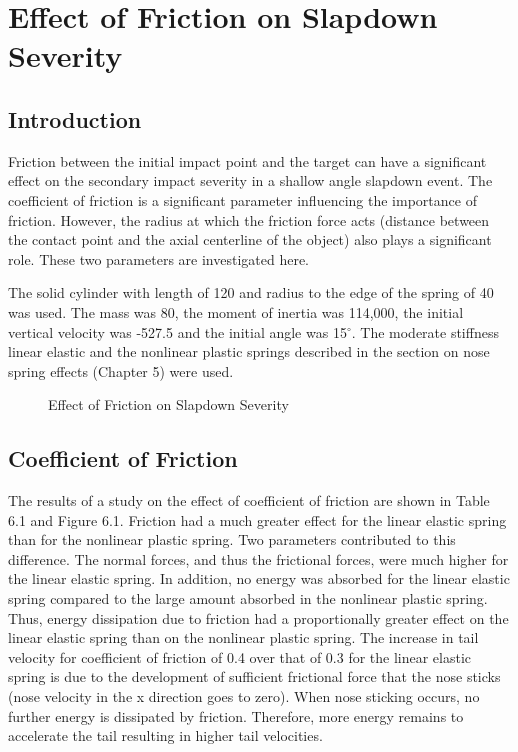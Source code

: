 \chapter{Effect of Friction on Slapdown Severity}

\section{Introduction}

     Friction between the initial impact point and the target can have 
a significant effect on the secondary impact severity in a 
shallow angle slapdown event.  The coefficient of friction 
is a significant parameter influencing the importance of friction. 
However, the radius at which the friction force acts (distance between 
the contact point and the axial centerline of the object) also plays a 
significant role.  These two parameters are investigated here.

     The solid cylinder with length of 120 and radius to the edge of
the spring of 40 was used.  The mass was 80, the moment of inertia was
114,000, the initial vertical velocity was -527.5 and the initial
angle was 15$^\circ$.  The moderate stiffness linear elastic and the
nonlinear plastic springs described in the section on nose spring
effects (Chapter 5) were used.  

\begin{figure}
\vspace{3.5 in}
\caption{Effect of Friction on Slapdown Severity}
\end{figure}

\section{Coefficient of Friction}

     The results of a study on the effect of coefficient of friction
are shown in Table 6.1 and Figure 6.1.  
Friction had a much
greater effect for the linear elastic spring than for the nonlinear
plastic spring.  Two parameters contributed to this difference.  The
normal forces, and thus the frictional forces, were much higher for the
linear elastic spring. In addition, no energy was absorbed for the
linear elastic spring compared to the large amount absorbed in the
nonlinear plastic spring. Thus, energy dissipation due to friction
had a proportionally greater effect on the linear
elastic spring than on the nonlinear plastic spring. The increase in
tail velocity for coefficient of friction of 0.4 over that of 0.3 for
the linear elastic spring is due to the development of sufficient
frictional force that the nose sticks (nose velocity in the x
direction goes to zero).  When nose sticking occurs, no further energy
is dissipated by friction.  Therefore, more energy remains to
accelerate the tail resulting in higher tail velocities. 

